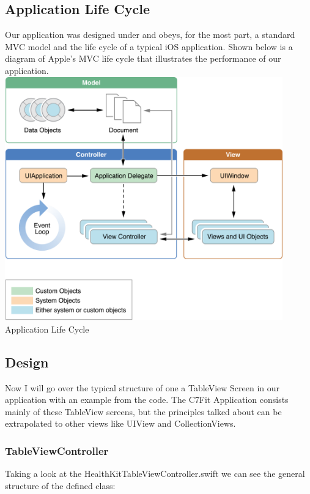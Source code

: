 \subsection{Application Life Cycle}
Our application was designed under and obeys, for the most part, a standard MVC model and the life cycle of a typical iOS application. Shown below is a diagram of Apple's MVC life cycle that illustrates the performance of our application.\\
\includegraphics[width=0.9\textwidth]{img/ios_core.png}\\
Application Life Cycle \\

\subsection{Design}
Now I will go over the typical structure of one a TableView Screen in our application with an example from the code. The C7Fit Application consists mainly of these TableView screens, but the principles talked about can be extrapolated to other views like UIView and CollectionViews.\\

\subsubsection{TableViewController}

Taking a look at the HealthKitTableViewController.swift we can see the general structure of the defined class: \\

